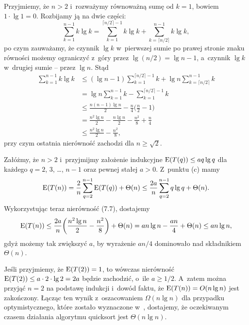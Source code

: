\noindent Przyjmiemy, że $n>2$ i~rozważymy równoważną sumę od $k=1$, bowiem $1\cdot\lg1=0$.
Rozbijamy ją na dwie części:
\[
	\sum_{k=1}^{n-1}k\lg k = \sum_{k=1}^{\lceil n/2\rceil-1}k\lg k+\sum_{k=\lceil n/2\rceil}^{n-1}k\lg k,
\]
po czym zauważamy, że czynnik $\lg k$ w~pierwszej sumie po prawej stronie znaku równości możemy ograniczyć z~góry przez $\lg(n/2)=\lg n-1$, a~czynnik $\lg k$ w~drugiej sumie -- przez $\lg n$.
Stąd
\begin{align*}
	\sum_{k=1}^{n-1}k\lg k &\le (\lg n-1)\sum_{k=1}^{\lceil n/2\rceil-1}k+\lg n\sum_{k=\lceil n/2\rceil}^{n-1}k \\
	&= \lg n\sum_{k=1}^{n-1}k-\sum_{k=1}^{\lceil n/2\rceil-1}k \\[2mm]
	&\le \frac{n(n-1)\lg n}{2}-\frac{n}{4}\biggl(\frac{n}{2}-1\biggr) \\
	&= \frac{n^2\lg n}{2}-\frac{n\lg n}{2}-\frac{n^2}{8}+\frac{n}{4} \\[1mm]
	&\le \frac{n^2\lg n}{2}-\frac{n^2}{8},
\end{align*}
przy czym ostatnia nierówność zachodzi dla $n\ge\sqrt{2}$.

\subproblem %
Załóżmy, że $n>2$ i~przyjmijmy założenie indukcyjne $\operatorname{E}(T(q))\le aq\lg q$ dla każdego $q=2$, 3, \dots, $n-1$ oraz pewnej stałej $a>0$.
Z~punktu (c) mamy
\[
	\operatorname{E}(T(n)) = \frac{2}{n}\sum_{q=2}^{n-1}\operatorname{E}(T(q))+\Theta(n) \le \frac{2a}{n}\sum_{q=2}^{n-1}q\lg q+\Theta(n).
\]
Wykorzystując teraz nierówność (7.7), dostajemy
\[
	\operatorname{E}(T(n)) \le \frac{2a}{n}\biggl(\frac{n^2\lg n}{2}-\frac{n^2}{8}\biggr)+\Theta(n) = an\lg n-\frac{an}{4}+\Theta(n) \le an\lg n,
\]
gdyż możemy tak zwiększyć $a$, by wyrażenie $an/4$ dominowało nad składnikiem $\Theta(n)$.

Jeśli przyjmiemy, że $\operatorname{E}(T(2))=1$, to wówczas nierówność $\operatorname{E}(T(2))\le a\cdot2\cdot\lg2=2a$ będzie zachodzić, o~ile $a\ge1/2$.
A~zatem można przyjąć $n=2$ na podstawę indukcji i~dowód faktu, że $\operatorname{E}(T(n))=O(n\lg n)$ jest zakończony.
Łącząc ten wynik z~oszacowaniem $\Omega(n\lg n)$ dla przypadku optymistycznego, które zostało wyznaczone w~, dostajemy, że oczekiwanym czasem działania algorytmu quicksort jest $\Theta(n\lg n)$.
